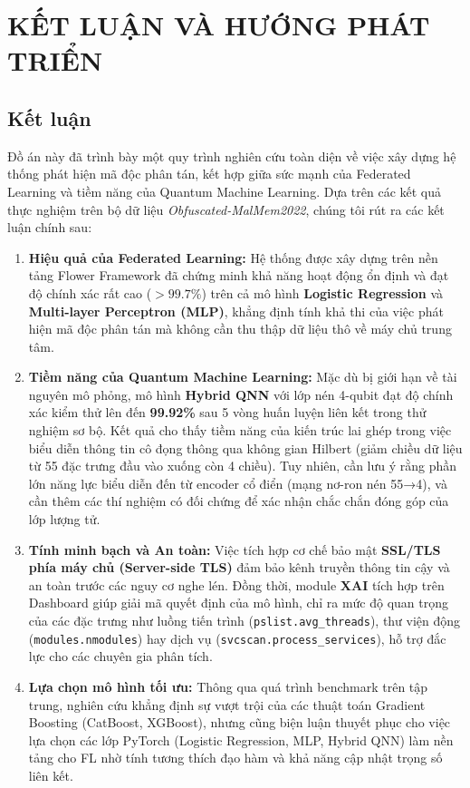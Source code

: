 \section{KẾT LUẬN VÀ HƯỚNG PHÁT TRIỂN}

\subsection{Kết luận}

Đồ án này đã trình bày một quy trình nghiên cứu toàn diện về việc xây dựng hệ thống phát hiện mã độc phân tán, kết hợp giữa sức mạnh của Federated Learning và tiềm năng của Quantum Machine Learning. Dựa trên các kết quả thực nghiệm trên bộ dữ liệu \textit{Obfuscated-MalMem2022}, chúng tôi rút ra các kết luận chính sau:

\begin{enumerate}
    \item \textbf{Hiệu quả của Federated Learning:} Hệ thống được xây dựng trên nền tảng Flower Framework \cite{beutel2022flowerfriendlyfederatedlearning} đã chứng minh khả năng hoạt động ổn định và đạt độ chính xác rất cao ($> 99.7\%$) trên cả mô hình \textbf{Logistic Regression} và \textbf{Multi-layer Perceptron (MLP)}, khẳng định tính khả thi của việc phát hiện mã độc phân tán mà không cần thu thập dữ liệu thô về máy chủ trung tâm.
    
    \item \textbf{Tiềm năng của Quantum Machine Learning:} Mặc dù bị giới hạn về tài nguyên mô phỏng, mô hình \textbf{Hybrid QNN} với lớp nén 4-qubit đạt độ chính xác kiểm thử lên đến \textbf{99.92\%} sau 5 vòng huấn luyện liên kết trong thử nghiệm sơ bộ. Kết quả cho thấy tiềm năng của kiến trúc lai ghép trong việc biểu diễn thông tin cô đọng thông qua không gian Hilbert (giảm chiều dữ liệu từ 55 đặc trưng đầu vào xuống còn 4 chiều). Tuy nhiên, cần lưu ý rằng phần lớn năng lực biểu diễn đến từ encoder cổ điển (mạng nơ-ron nén 55→4), và cần thêm các thí nghiệm có đối chứng để xác nhận chắc chắn đóng góp của lớp lượng tử.
    
    \item \textbf{Tính minh bạch và An toàn:} Việc tích hợp cơ chế bảo mật \textbf{SSL/TLS phía máy chủ (Server-side TLS)} đảm bảo kênh truyền thông tin cậy và an toàn trước các nguy cơ nghe lén. Đồng thời, module \textbf{XAI} tích hợp trên Dashboard giúp giải mã quyết định của mô hình, chỉ ra mức độ quan trọng của các đặc trưng như luồng tiến trình (\texttt{pslist.avg\_threads}), thư viện động (\texttt{modules.nmodules}) hay dịch vụ (\texttt{svcscan.process\_services}), hỗ trợ đắc lực cho các chuyên gia phân tích.
    
    \item \textbf{Lựa chọn mô hình tối ưu:} Thông qua quá trình benchmark trên tập trung, nghiên cứu khẳng định sự vượt trội của các thuật toán Gradient Boosting (CatBoost, XGBoost), nhưng cũng biện luận thuyết phục cho việc lựa chọn các lớp PyTorch (Logistic Regression, MLP, Hybrid QNN) làm nền tảng cho FL nhờ tính tương thích đạo hàm và khả năng cập nhật trọng số liên kết.
\end{enumerate}

